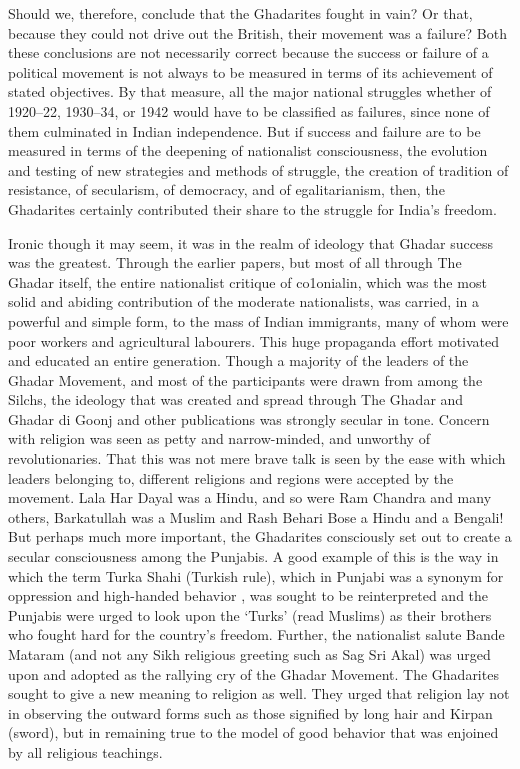 Should we, therefore, conclude that the Ghadarites fought in vain? Or that, because they could not drive out the British, their movement was a failure? Both these conclusions are not necessarily correct because the success or failure of a political movement is not always to be measured in terms of its achievement of stated objectives. By that measure, all the major national struggles whether of 1920--22, 1930--34, or 1942 would have to be classified as failures, since none of them culminated in Indian independence. But if success and failure are to be measured in terms of the deepening of nationalist consciousness, the evolution and testing of new strategies and methods of struggle, the creation of tradition of resistance, of secularism, of democracy, and of egalitarianism, then, the Ghadarites certainly contributed their share to the struggle for India's freedom.

Ironic though it may seem, it was in the realm of ideology that Ghadar success was the greatest. Through the earlier papers, but most of all through The Ghadar itself, the entire nationalist critique of co1onialin, which was the most solid and abiding contribution of the moderate nationalists, was carried, in a powerful and simple form, to the mass of Indian immigrants, many of whom were poor workers and agricultural labourers. This huge propaganda effort motivated and educated an entire generation. Though a majority of the leaders of the Ghadar Movement, and most of the participants were drawn from among the Silchs, the ideology that was created and spread through The Ghadar and Ghadar di Goonj and other publications was strongly secular in tone. Concern with religion was seen as petty and narrow-minded, and unworthy of revolutionaries. That this was not mere brave talk is seen by the ease with which leaders belonging to, different religions and regions were accepted by the movement. Lala Har Dayal was a Hindu, and so were Ram Chandra and many others, Barkatullah was a Muslim and Rash Behari Bose a Hindu and a Bengali! But perhaps much more important, the Ghadarites consciously set out to create a secular consciousness among the Punjabis. A good example of this is the way in which the term Turka Shahi (Turkish rule), which in Punjabi was a synonym for oppression and high-handed behavior , was sought to be reinterpreted and the Punjabis were urged to look upon the `Turks' (read Muslims) as their brothers who fought hard for the country's freedom. Further, the nationalist salute Bande Mataram (and not any Sikh religious greeting such as Sag Sri Akal) was urged upon and adopted as the rallying cry of the Ghadar Movement. The Ghadarites sought to give a new meaning to religion as well. They urged that religion lay not in observing the outward forms such as those signified by long hair and Kirpan (sword), but in remaining true to the model of good behavior that was enjoined by all religious teachings.

